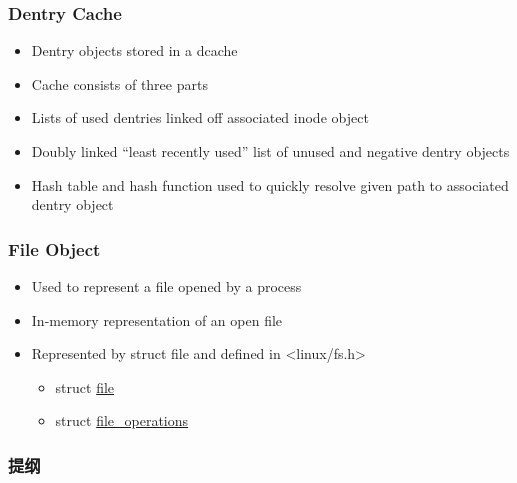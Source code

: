 \begin{frame}[fragile]
    \frametitle{Dentry Cache}

    \begin{itemize}
        \item Dentry objects stored in a dcache
        \item Cache consists of three parts
        \item Lists of used dentries linked off associated inode object
        \item Doubly linked “least recently used” list of unused and negative dentry objects
        \item Hash table and hash function used to quickly resolve given path to associated dentry object
    \end{itemize}
% 
\end{frame}
\begin{frame}[fragile]
    \frametitle{File Object}


    \begin{itemize}
        \item Used to represent a file opened by a process
        \item In-memory representation of an open file
        \item Represented by struct file and defined in <linux/fs.h>
	    \begin{itemize}
	        \item struct \href{https://elixir.bootlin.com/linux/latest/source/include/linux/fs.h\#L915}{file}
          \item struct \href{https://elixir.bootlin.com/linux/latest/source/include/linux/fs.h\#L1820}{file\_operations}
      \end{itemize}
    \end{itemize}
% 
\end{frame}
\begin{frame}
\frametitle{提纲} %
\tableofcontents %
\end{frame}
